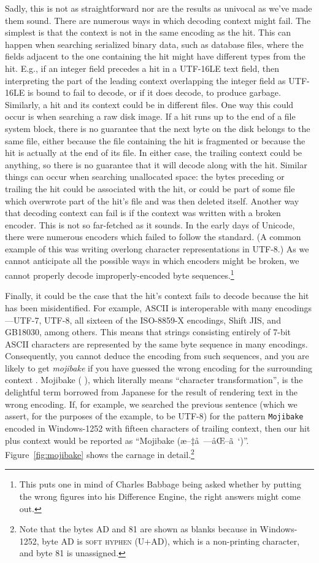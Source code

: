 \documentclass[5p,final,number,sort&compress]{elsarticle}
\newcommand{\re}[1]{\texttt{#1}}
\begin{document}
Sadly, this is not as straightforward nor are the results as univocal as we've made them sound. There are numerous ways in which decoding context might fail. The simplest is that the context is not in the same encoding as the hit. This can happen when searching serialized binary data, such as database files, where the fields adjacent to the one containing the hit might have different types from the hit. E.g., if an integer field precedes a hit in a UTF-16LE text field, then interpreting the part of the leading context overlapping the integer field as UTF-16LE is bound to fail to decode, or if it does decode, to produce garbage. Similarly, a hit and its context could be in different files. One way this could occur is when searching a raw disk image. If a hit runs up to the end of a file system block, there is no guarantee that the next byte on the disk belongs to the same file, either because the file containing the hit is fragmented or because the hit is actually at the end of its file. In either case, the trailing context could be anything, so there is no guarantee that it will decode along with the hit. Similar things can occur when searching unallocated space: the bytes preceding or trailing the hit could be associated with the hit, or could be part of some file which overwrote part of the hit's file and was then deleted itself. Another way that decoding context can fail is if the context was written with a broken encoder. This is not so far-fetched as it sounds. In the early days of Unicode, there were numerous encoders which failed to follow the standard. (A common example of this was writing overlong character representations in UTF-8.) As we cannot anticipate all the possible ways in which encoders might be broken, we cannot properly decode improperly-encoded byte sequences.\footnote{This puts one in mind of Charles Babbage being asked whether by putting the wrong figures into his Difference Engine, the right answers might come out.}

Finally, it could be the case that the hit's context fails to decode because the hit has been misidentified. For example, ASCII is interoperable with many encodings---UTF-7, UTF-8, all sixteen of the ISO-8859-X encodings, Shift JIS, and GB18030, among others. This means that strings consisting entirely of 7-bit ASCII characters are represented by the same byte sequence in many encodings. Consequently, you cannot deduce the encoding from such sequences, and you are likely to get \emph{mojibake} if you have guessed the wrong encoding for the surrounding context . Mojibake (
), which literally means ``character transformation'', is the delightful term borrowed from Japanese for the result of rendering text in the wrong encoding. If, for example, we searched the previous sentence (which we assert, for the purposes of the example, to be UTF-8) for the pattern \re{Mojibake} encoded in Windows-1252 with fifteen characters of trailing context, then our hit plus context would be reported as ``Mojibake (æ–‡å\ —åŒ–ã\ ‘)''. Figure~\ref{fig:mojibake} shows the carnage in detail.\footnote{Note that the bytes AD and 81 are shown as blanks because in Windows-1252, byte AD is \textsc{soft hyphen} (U+AD), which is a non-printing character, and byte 81 is unassigned.}
\end{document}
